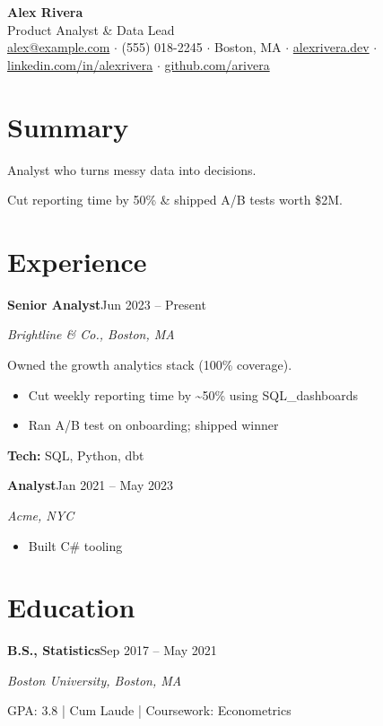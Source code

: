 \documentclass{article}
\newcommand{\accentcolor}{\color{accent}}
\begin{document}
\begin{center}
{\LARGE\bfseries Alex Rivera}\\[2pt]{\accentcolor\large Product Analyst \& Data Lead}\\[5pt]{\small \href{mailto:alex@example.com}{alex@example.com} $\cdot$ (555) 018-2245 $\cdot$ Boston, MA $\cdot$ \href{https://alexrivera.dev}{alexrivera.dev} $\cdot$ \href{https://linkedin.com/in/alexrivera}{linkedin.com/in/alexrivera} $\cdot$ \href{https://github.com/arivera}{github.com/arivera}}
\end{center}
\vspace{2pt}

\section*{Summary}
Analyst who turns messy data into decisions.

Cut reporting time by 50\% \& shipped A/B tests worth \$2M.

\section*{Experience}
\noindent\textbf{Senior Analyst}\hfill{\small Jun 2023 -- Present}\par
{\small\itshape Brightline \& Co., Boston, MA}\par
Owned the growth analytics stack (100\% coverage).\par
\begin{itemize}[leftmargin=1.25em, itemsep=2pt, topsep=2pt, parsep=0pt]
  \item Cut weekly reporting time by \textasciitilde{}50\% using SQL\_dashboards
  \item Ran A/B test on onboarding; shipped winner
\end{itemize}
{\small\textbf{Tech:} SQL, Python, dbt}\par
\vspace{7pt}
\noindent\textbf{Analyst}\hfill{\small Jan 2021 -- May 2023}\par
{\small\itshape Acme, NYC}\par
\begin{itemize}[leftmargin=1.25em, itemsep=2pt, topsep=2pt, parsep=0pt]
  \item Built C\# tooling
\end{itemize}

\section*{Education}
\noindent\textbf{B.S., Statistics}\hfill{\small Sep 2017 -- May 2021}\par
{\small\itshape Boston University, Boston, MA}\par
{\small GPA: 3.8 | Cum Laude | Coursework: Econometrics}\par
\end{document}
